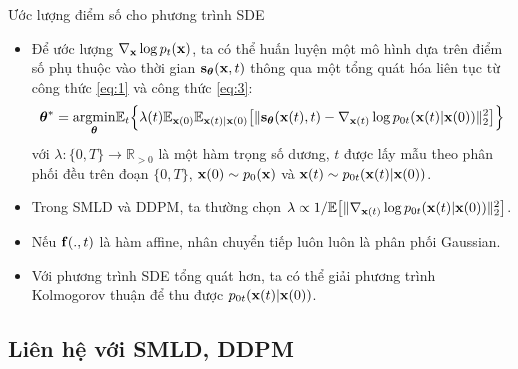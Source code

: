 \documentclass[10pt]{beamer}
\theoremstyle{remark}
\numberwithin{algocf}{section}
\numberwithin{equation}{section}
\numberwithin{dl}{section}
\numberwithin{figure}{section}
\begin{document}
\begin{frame}[shrink]{Ước lượng điểm số cho phương trình SDE}
	\begin{itemize}
		\item Để ước lượng $\nabla_{\bold{x}} \log p_t(\bold{x})$, ta có thể huấn luyện một mô hình dựa trên điểm số phụ thuộc vào thời gian $\bold{s}_{\boldsymbol{\theta}}(\bold{x}, t)$ thông qua một tổng quát hóa liên tục từ công thức \ref{eq:1} và công thức \ref{eq:3}:
		\begin{equation} \label{eq:7}
			\boldsymbol{\theta}^{\ast} = \underset{\boldsymbol{\theta}}{\mathrm{argmin}} \mathbb{E}_t \Big \lbrace  \lambda(t) \mathbb{E}_{\bold{x}(0)} \mathbb{E}_{\bold{x}(t) \vert \bold{x}(0)} \big \lbrack \lVert \bold{s}_{\boldsymbol{\theta}} (\bold{x}(t), t) - \nabla_{\bold{x}(t)} \log p_{0t} (\bold{x}(t) \vert \bold{x}(0)) \rVert_2^2 \big \rbrack \Big \rbrace
		\end{equation}
		với $\lambda: \lbrace 0, T \rbrace \rightarrow \mathbb{R}_{>0}$ là một hàm trọng số dương,
		$t$ được lấy mẫu theo phân phối đều trên đoạn $\lbrace 0, T \rbrace$, $\bold{x}(0) \sim p_0 (\bold{x})$ và $\bold{x}(t) \sim p_{0t} (\bold{x}(t) \vert \bold{x}(0))$.
		\item Trong SMLD và DDPM, ta thường chọn $\lambda \propto 1 / \mathbb{E} \big \lbrack \lVert \nabla_{\bold{x}(t)} \log p_{0t} (\bold{x}(t) \vert \bold{x}(0)) \rVert_2^2 \big \rbrack$.
		\item Nếu $\bold{f}(.,t)$ là hàm affine, nhân chuyển tiếp luôn luôn là phân phối Gaussian.
		\item Với phương trình SDE tổng quát hơn, ta có thể giải phương trình Kolmogorov thuận \citep{oksendal2003stochastic} để thu được $p_{0t} (\bold{x}(t) \vert \bold{x}(0))$.
	\end{itemize}
\end{frame}

\subsection{Liên hệ với SMLD, DDPM}
\end{document}
